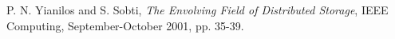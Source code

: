 \begin{thebibliography}{99}

P. {N}. Yianilos and S. Sobti, \emph{The Envolving Field of Distributed Storage}, IEEE Computing, September-October 2001, pp. 35-39.




\end{thebibliography}